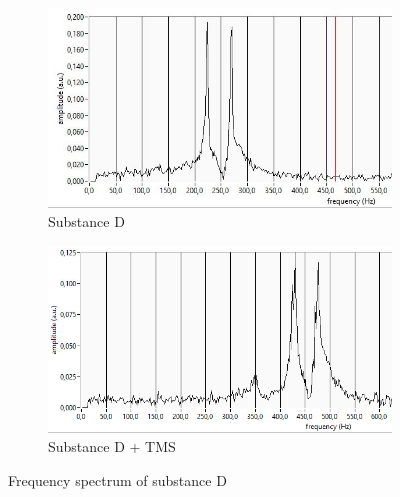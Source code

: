 \begin{figure}[!htbp]
  \centering
  \begin{subfigure}[b]{0.47\textwidth}
    \centering
    \includegraphics[width=\textwidth]{./Latex images/D.jpg}
    \caption{Substance D}
    \label{fig: D}
  \end{subfigure}
  \hfill
  \begin{subfigure}[b]{0.47\textwidth}
    \centering
    \includegraphics[width=\textwidth]{./Latex images/Dp.png}
    \caption{Substance D + TMS}
    \label{fig: D + TMS}
  \end{subfigure}
  \caption{Frequency spectrum of substance D}
  \label{fig:Sample D}
\end{figure}


